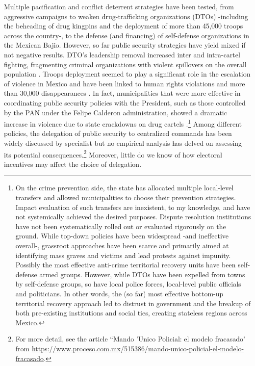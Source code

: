 Multiple pacification and conflict deterrent strategies have been tested, from aggressive campaigns to weaken drug-trafficking organizations (DTOs) -including the beheading of drug kingpins and the deployment of more than 45,000 troops across the country-, to the defense (and financing) of self-defense organizations in the Mexican Bajio. However, so far public security strategies have yield mixed if not negative results. DTO's leadership removal increased inter and intra-cartel fighting, fragmenting criminal organizations with violent spillovers on the overall population \citep{guerrero_2011}. Troops deployment seemed to play a significant role in the escalation of violence in Mexico \citep{escalante_2011} and have been linked to human rights violations and more than 30,000 disappearances \citep{daly_etal_2012, moloeznik_etal_2012, magaloni_magaloni_razu_2018}. In fact, municipalities that were more effective in coordinating public security policies with the President, such as those controlled by the PAN under the Felipe Calderon administration, showed a dramatic increase in violence due to state crackdowns on drug cartels \citep{dell_2015}.\footnote{On the crime prevention side, the state has allocated multiple local-level transfers and allowed municipalities to choose their prevention strategies. Impact evaluation of such transfers are inexistent, to my knowledge, and have not systemically achieved the desired purposes. Dispute resolution institutions have not been systematically rolled out or evaluated rigorously on the ground. While top-down policies have been widespread -and ineffective overall-, grassroot approaches have been scarce and primarily aimed at identifying mass graves and victims and lead protests against impunity. Possibly the most effective anti-crime territorial recovery units have been self-defense armed groups. However, while DTOs have been expelled from towns by self-defense groups, so have local police forces, local-level public officials and politicians. In other words, the (so far) most effective bottom-up territorial recovery approach led to distrust in government and the breakup of both pre-existing institutions and social ties, creating stateless regions across Mexico.} Among different policies, the delegation of public security to centralized commands has been widely discussed by specialist but no empirical analysis has delved on assessing its potential consequences.\footnote{For more detail, see the article ``Mando 'Unico Policial: el modelo fracasado" from \url{https://www.proceso.com.mx/515386/mando-unico-policial-el-modelo-fracasado}.}  Moreover, little do we know of how electoral incentives may affect the choice of delegation.

